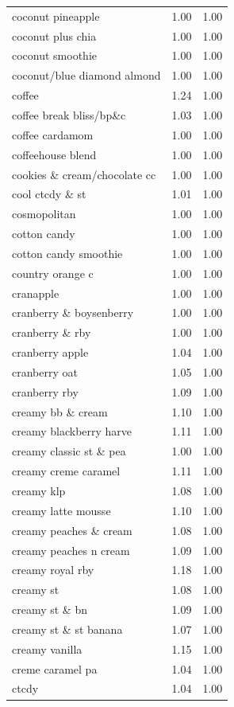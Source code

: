 \begin{table}
\begin{tabular}{lrr}
coconut pineapple & 1.00 & 1.00 \\
coconut plus chia & 1.00 & 1.00 \\
coconut smoothie & 1.00 & 1.00 \\
coconut/blue diamond almond & 1.00 & 1.00 \\
coffee & 1.24 & 1.00 \\
coffee break bliss/bp\&c & 1.03 & 1.00 \\
coffee cardamom & 1.00 & 1.00 \\
coffeehouse blend & 1.00 & 1.00 \\
cookies \& cream/chocolate cc & 1.00 & 1.00 \\
cool ctcdy \& st & 1.01 & 1.00 \\
cosmopolitan & 1.00 & 1.00 \\
cotton candy & 1.00 & 1.00 \\
cotton candy smoothie & 1.00 & 1.00 \\
country orange c & 1.00 & 1.00 \\
cranapple & 1.00 & 1.00 \\
cranberry \& boysenberry & 1.00 & 1.00 \\
cranberry \& rby & 1.00 & 1.00 \\
cranberry apple & 1.04 & 1.00 \\
cranberry oat & 1.05 & 1.00 \\
cranberry rby & 1.09 & 1.00 \\
creamy bb \& cream & 1.10 & 1.00 \\
creamy blackberry harve & 1.11 & 1.00 \\
creamy classic st \& pea & 1.00 & 1.00 \\
creamy creme caramel & 1.11 & 1.00 \\
creamy klp & 1.08 & 1.00 \\
creamy latte mousse & 1.10 & 1.00 \\
creamy peaches \& cream & 1.08 & 1.00 \\
creamy peaches n cream & 1.09 & 1.00 \\
creamy royal rby & 1.18 & 1.00 \\
creamy st & 1.08 & 1.00 \\
creamy st \& bn & 1.09 & 1.00 \\
creamy st \& st banana & 1.07 & 1.00 \\
creamy vanilla & 1.15 & 1.00 \\
creme caramel pa & 1.04 & 1.00 \\
ctcdy & 1.04 & 1.00 \\

\end{tabular}
\end{table}
